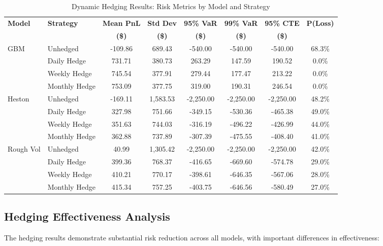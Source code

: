 \documentclass[12pt,a4paper]{report}
\begin{document}
\begin{table}[H]
\centering
\caption{Dynamic Hedging Results: Risk Metrics by Model and Strategy}
\label{tab:hedging_results}
\begin{tabular}{llcccccc}
\toprule
\textbf{Model} & \textbf{Strategy} & \textbf{Mean PnL} & \textbf{Std Dev} & \textbf{95\% VaR} & \textbf{99\% VaR} & \textbf{95\% CTE} & \textbf{P(Loss)} \\
& & \textbf{(\$)} & \textbf{(\$)} & \textbf{(\$)} & \textbf{(\$)} & \textbf{(\$)} & \\
\midrule
\multirow{4}{*}{GBM} & Unhedged & -109.86 & 689.43 & -540.00 & -540.00 & -540.00 & 68.3\% \\
& Daily Hedge & 731.71 & 380.73 & 263.29 & 147.59 & 190.52 & 0.0\% \\
& Weekly Hedge & 745.54 & 377.91 & 279.44 & 177.47 & 213.22 & 0.0\% \\
& Monthly Hedge & 753.09 & 377.75 & 319.00 & 190.31 & 246.54 & 0.0\% \\
\midrule
\multirow{4}{*}{Heston} & Unhedged & -169.11 & 1,583.53 & -2,250.00 & -2,250.00 & -2,250.00 & 48.2\% \\
& Daily Hedge & 327.98 & 751.66 & -349.15 & -530.36 & -465.38 & 49.0\% \\
& Weekly Hedge & 351.63 & 744.03 & -316.19 & -496.22 & -426.99 & 44.0\% \\
& Monthly Hedge & 362.88 & 737.89 & -307.39 & -475.55 & -408.40 & 41.0\% \\
\midrule
\multirow{4}{*}{Rough Vol} & Unhedged & 40.99 & 1,305.42 & -2,250.00 & -2,250.00 & -2,250.00 & 42.0\% \\
& Daily Hedge & 399.36 & 768.37 & -416.65 & -669.60 & -574.78 & 29.0\% \\
& Weekly Hedge & 410.21 & 770.17 & -398.61 & -646.35 & -567.06 & 28.0\% \\
& Monthly Hedge & 415.34 & 757.25 & -403.75 & -646.56 & -580.49 & 27.0\% \\
\bottomrule
\end{tabular}
\end{table}

\subsection{Hedging Effectiveness Analysis}

The hedging results demonstrate substantial risk reduction across all models, with important differences in effectiveness:
\end{document}
